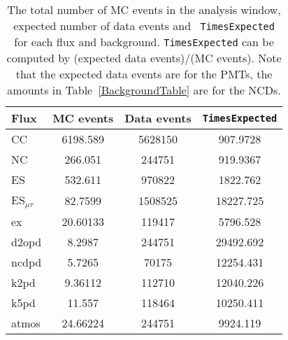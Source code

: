 \begin{table}
\centering
\begin{tabular}{ | l | c | c | c | }
\hline
Flux & MC events & Data events & {\tt TimesExpected}\\
\hline
CC & 6198.589 & 5628150 & 907.9728\\
NC & 266.051 & 244751 & 919.9367\\
ES & 532.611 & 970822 & 1822.762\\
ES$_{\mu\tau}$ & 82.7599 & 1508525 & 18227.725\\
\hline
ex & 20.60133 & 119417 & 5796.528\\
d2opd & 8.2987 & 244751 & 29492.692\\
ncdpd & 5.7265 & 70175 & 12254.431\\
k2pd & 9.36112 & 112710 & 12040.226\\
k5pd & 11.557 & 118464 & 10250.411\\
atmos & 24.66224 & 244751 & 9924.119\\
\hline
\end{tabular}
\caption[Number of MC and expected data events]{The total number of MC
events in the analysis window, expected number of data events and {\tt
TimesExpected} for each flux and background.  {\tt TimesExpected} can
be computed by (expected data events)/(MC events).  Note that the
expected data events are for the PMTs, the amounts in \mbox{Table
\ref{BackgroundTable}} are for the NCDs.
\label{FluxAmounts}}
\end{table}

